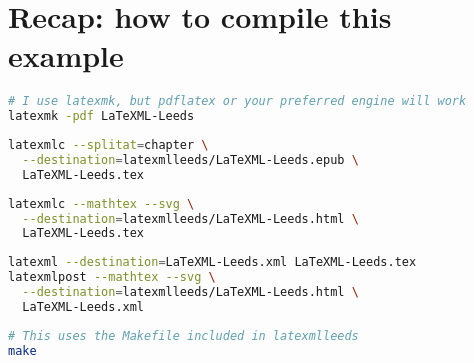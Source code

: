 \documentclass[a4paper]{article}
\theoremstyle{definition}
\begin{document}
\section{Recap: how to compile this example}
\begin{lstlisting}[language=bash,caption={Generate the PDF}]
# I use latexmk, but pdflatex or your preferred engine will work
latexmk -pdf LaTeXML-Leeds
\end{lstlisting}
\begin{lstlisting}[language=bash,caption={Generate the EPUB}]
latexmlc --splitat=chapter \
  --destination=latexmlleeds/LaTeXML-Leeds.epub \
  LaTeXML-Leeds.tex
\end{lstlisting}
\begin{lstlisting}[language=bash,caption={Generate the HTML}]
latexmlc --mathtex --svg \
  --destination=latexmlleeds/LaTeXML-Leeds.html \
  LaTeXML-Leeds.tex
\end{lstlisting}
\begin{lstlisting}[language=bash,caption={Generate the HTML in two steps}]
latexml --destination=LaTeXML-Leeds.xml LaTeXML-Leeds.tex
latexmlpost --mathtex --svg \
  --destination=latexmlleeds/LaTeXML-Leeds.html \
  LaTeXML-Leeds.xml
\end{lstlisting}
\begin{lstlisting}[language=bash,caption={Do all the above steps in one go}]
# This uses the Makefile included in latexmlleeds
make
\end{lstlisting}
\end{document}
